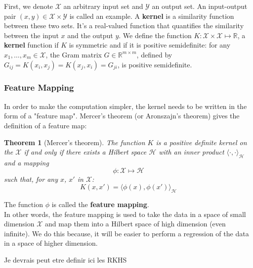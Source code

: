 \documentclass[a4paper, 11pt]{article}
\newtheorem{theorem}{Theorem}
\begin{document}
First, we denote $\mathcal{X}$ an arbitrary input set and $\mathcal{Y}$ an output set. An input-output pair $(x,y) \in \mathcal{X} \times \mathcal{Y}$ is called an example. A {\bf kernel} is a similarity function between these two sets. It's a real-valued function that quantifies the similarity between the input $x$ and the output $y$. We define the function 
$K: \mathcal{X}\times\mathcal{X} \mapsto \mathbb{R}$, a {\bf kernel} function if $K$ is symmetric and if it is positive semidefinite: for any $x_1, \ldots, x_m \in \mathcal{X}$, the Gram matrix $G\in \mathbb{R}^{m\times m}$, defined by $G_{ij} = K(x_i,x_j) = K(x_j,x_i) = G_{ji}$, is positive semidefinite.

\subsubsection{Feature Mapping}
\label{map}

In order to make the computation simpler, the kernel needs to be written in the form of a "feature map". Mercer's theorem (or Aronszajn's theorem) gives the definition of a feature map:
\begin{theorem} [Mercer's theorem]
The function $K$ is a positive definite kernel on the $\mathcal{X}$ if and only if there exists a Hilbert space $\mathcal{H}$ with an inner product $\langle \cdot,\cdot\rangle_{\mathcal{H}}$ and a mapping
\[
\phi: \mathcal{X}\mapsto\mathcal{H}
\]
such that, for any $x$, $x'$ in $\mathcal{X}$:
\[
K(x,x') = \langle\phi(x),\phi(x')\rangle_{\mathcal{H}}
\]
\end{theorem}
The function $\phi$ is called the {\bf feature mapping}.
\\
In other words, the feature mapping is used to take the data in a space of small dimension $\mathcal{X}$ and map them into a Hilbert space of high dimension (even infinite). We do this because, it will be easier to perform a regression of the data in a space of higher dimension.

{\color{red} Je devrais peut etre definir ici les RKHS}
\end{document}
